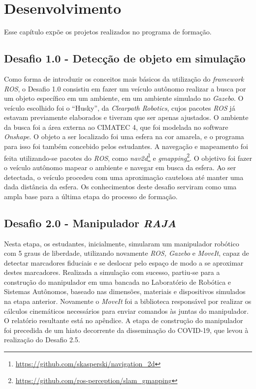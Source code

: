 \chapter{Desenvolvimento}
\label{chap:desenvolvimento}

Esse capítulo expõe os projetos realizados no programa de formação.


\section{Desafio 1.0 - Detecção de objeto em simulação}
\label{sec:des1}

Como forma de introduzir os conceitos mais básicos da utilização do \textit{framework} \textit{ROS}, o Desafio 1.0 consistiu em fazer um veículo autônomo realizar a busca  por um objeto específico em um ambiente, em um ambiente simulado no \textit{Gazebo}. O veículo escolhido foi o ``Husky'', da \textit{Clearpath Robotics}, cujos pacotes \textit{ROS} já estavam previamente elaborados e tiveram que ser apenas ajustados. O ambiente da busca foi a área externa ao CIMATEC 4, que foi modelada no software \textit{Onshape}. O objeto a ser localizado foi uma esfera na cor amarela, e o programa para isso foi também concebido pelos estudantes.  A navegação e mapeamento foi feita utilizando-se pacotes do \textit{ROS}, como \textit{nav2d}\footnote{\url{https://github.com/skasperski/navigation_2d}} e \textit{gmapping}\footnote{\url{https://github.com/ros-perception/slam_gmapping}}. O objetivo foi fazer o veículo autônomo mapear o ambiente e navegar em busca da esfera. Ao ser detectada, o veículo procedeu com uma aproximação cautelosa até manter uma dada distância da esfera. Os conhecimentos deste desafio serviram como uma ampla base para a última etapa do processo de formação.


\section{Desafio 2.0 - Manipulador \textit{RAJA}}
\label{sec:des2}

Nesta etapa, os estudantes, inicialmente, simularam um manipulador robótico com 5 graus de liberdade, utilizando novamente \textit{ROS, Gazebo} e \textit{MoveIt}, capaz de detectar marcadores fiduciais e se deslocar pelo espaço de modo a se aproximar destes marcadores. 
Realizada a simulação com sucesso, partiu-se para a construção do manipulador em uma bancada no Laboratório de Robótica e Sistemas Autônomos, baseado nas dimensões, materiais e dispositivos simulados na etapa anterior. Novamente o \textit{MoveIt} foi a biblioteca responsável por realizar os cálculos cinemáticos necessários para enviar comandos às juntas do manipulador. O relatório resultante está no apêndice. A etapa de construção do manipulador foi precedida de um hiato decorrente da disseminação do COVID-19, que levou à realização do Desafio 2.5.

